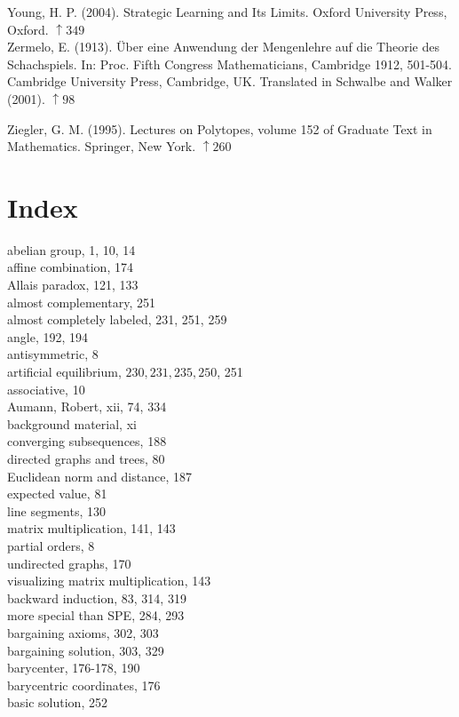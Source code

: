 \documentclass[12pt]{article}
\begin{document}
Young, H. P. (2004). Strategic Learning and Its Limits. Oxford University Press, Oxford. $\uparrow 349$\\
Zermelo, E. (1913). Über eine Anwendung der Mengenlehre auf die Theorie des Schachspiels. In: Proc. Fifth Congress Mathematicians, Cambridge 1912, 501-504. Cambridge University Press, Cambridge, UK. Translated in Schwalbe and Walker (2001). $\uparrow 98$

Ziegler, G. M. (1995). Lectures on Polytopes, volume 152 of Graduate Text in Mathematics. Springer, New York. $\uparrow 260$

\section*{Index}
abelian group, 1, 10, 14\\
affine combination, 174\\
Allais paradox, 121, 133\\
almost complementary, 251\\
almost completely labeled, 231, 251, 259\\
angle, 192, 194\\
antisymmetric, 8\\
artificial equilibrium, $230,231,235,250$, 251\\
associative, 10\\
Aumann, Robert, xii, 74, 334\\
background material, xi\\
converging subsequences, 188\\
directed graphs and trees, 80\\
Euclidean norm and distance, 187\\
expected value, 81\\
line segments, 130\\
matrix multiplication, 141, 143\\
partial orders, 8\\
undirected graphs, 170\\
visualizing matrix multiplication, 143\\
backward induction, 83, 314, 319\\
more special than SPE, 284, 293\\
bargaining axioms, 302, 303\\
bargaining solution, 303, 329\\
barycenter, 176-178, 190\\
barycentric coordinates, 176\\
basic solution, 252\\
\end{document}
